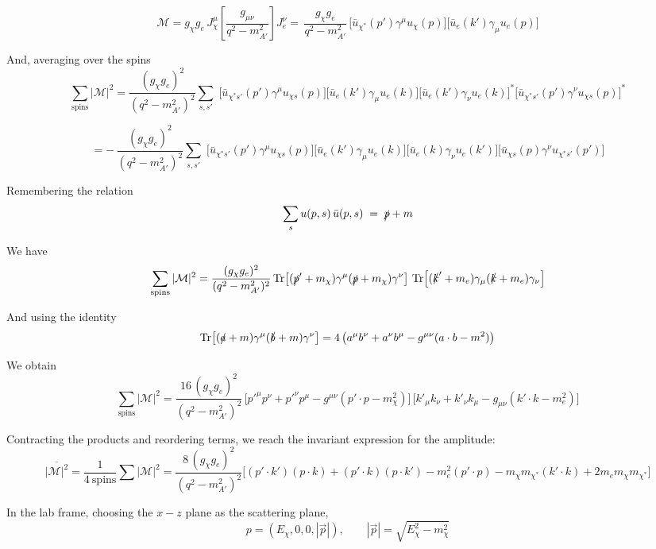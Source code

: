 \documentclass[13.1pt, letterpaper, twoside]{article}
\begin{document}
\[
    \mathcal{M}
    = g_\chi g_e\, J_\chi^\mu \left[\frac{g_{\mu\nu}}{q^2-m_{A'}^2}\right] J_e^\nu
    = \,\frac{g_\chi g_e}{q^2-m_{A'}^2}\,
    \big[\bar{u}_{\chi^\ast}(p')\gamma^\mu u_\chi(p)\big]
        \big[\bar{u}_e(k')\gamma_\mu u_e(p)\big]
\]

And, averaging over the spins
\[
    \sum_{\text{spins}} \lvert \mathcal{M}\rvert^2
    = \frac{(g_\chi g_e)^2}{(q^2-m_{A'}^2)^2} \sum_{s,s'}\;
    \big[\bar{u}_{\chi^\ast s'}(p')\gamma^\mu u_{\chi s}(p)\big]
        \big[\bar{u}_e(k')\gamma_\mu u_e(k)\big]
        \big[\bar{u}_e(k')\gamma_\nu u_e(k)\big]^{*}
        \big[\bar{u}_{\chi^\ast s'}(p')\gamma^\nu u_{\chi s}(p)\big]^{*}
\]

\[
    = -\,\frac{(g_\chi g_e)^2}{(q^2-m_{A'}^2)^2} \sum_{s,s'}\;
    \big[\bar{u}_{\chi^\ast s'}(p')\gamma^\mu u_{\chi s}(p)\big]
        \big[\bar{u}_e(k')\gamma_\mu u_e(k)\big]
    \big[\bar{u}_e(k)\gamma_\nu u_e(k')\big]
    \big[\bar{u}_{\chi s}(p)\gamma^\nu u_{\chi^\ast s'}(p')\big]
\]

Remembering the relation
\[
\sum_s u(p,s)\,\bar{u}(p,s) \;=\; \slashed{p} + m
\]

We have
\[
\sum_{\text{spins}} |\mathcal{M}|^2
= \frac{(g_\chi g_e)^2}{(q^2 - m_{A'}^2)^2}\,
\mathrm{Tr}\!\left[(\slashed{p}' + m_\chi)\gamma^\mu(\slashed{p}+m_\chi)\gamma^\nu\right]\,
\mathrm{Tr}\!\left[(\slashed{k}' + m_e)\gamma_\mu(\slashed{k}+m_e)\gamma_\nu\right]
\]

And using the identity
\[
\mathrm{Tr}\!\left[(\slashed{a}+m)\gamma^\mu(\slashed{b}+m)\gamma^\nu\right]
= 4\left(a^\mu b^\nu + a^\nu b^\mu - g^{\mu\nu}(a\cdot b - m^2)\right)
\]

We obtain
\[
\sum_{\text{spins}} |\mathcal{M}|^2
= \frac{16\,(g_\chi g_e)^2}{(q^2 - m_{A'}^2)^2}\,
\Big[p'^\mu p^\nu + p'^\nu p^\mu - g^{\mu\nu}(p'\cdot p - m_\chi^2)\Big]\,
\Big[k'_\mu k_\nu + k'_\nu k_\mu - g_{\mu\nu}(k'\cdot k - m_e^2)\Big]
\]

Contracting the products and reordering terms, we reach the invariant expression for the amplitude:
\begin{equation}
    \overline{|\mathcal{M}|^2}
    = \frac{1}{4\ \text{spins}} \sum |\mathcal{M}|^2
    = \frac{8\,(g_\chi g_e)^2}{(q^2 - m_{A'}^2)^2}
    \Big[ (p'\!\cdot k')(p\!\cdot k) + (p'\!\cdot k)(p\!\cdot k') - m_e^2 (p'\!\cdot p) - m_\chi m_{\chi^\ast} (k'\!\cdot k) + 2 m_e m_\chi m_{\chi^\ast} \Big]    
    \label{invamplitude}
\end{equation}

In the lab frame, choosing the $x-z$ plane as the scattering plane,
\[
p = (E_\chi, 0, 0, |\vec{p}|), 
\qquad |\vec{p}| = \sqrt{E_\chi^2 - m_\chi^2}
\]
\end{document}
